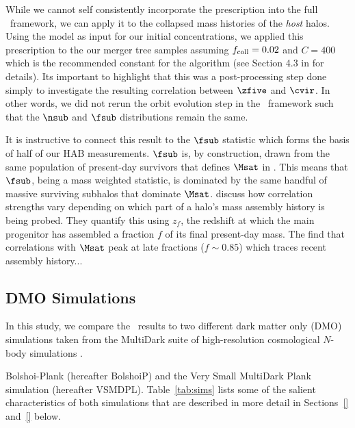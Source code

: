 While we cannot self consistently incorporate the \cite{Ludlow.etal.16} prescription into the full \SatGen\ framework, we can apply it to the collapsed mass histories of the \textit{host} halos. Using the \cite{Zhao.etal.09} model as input for our initial concentrations, we applied this prescription to the our merger tree samples assuming $f_{\rm coll}=0.02$ and $C=400$ which is the recommended constant for the \cite{Parkinson.etal.08} algorithm (see Section 4.3 in \citealt{Ludlow.etal.16} for details). Its important to highlight that this was a post-processing step done simply to investigate the resulting correlation between $\zfive$ and $\cvir$. In other words, we did not rerun the orbit evolution step in the \SatGen\ framework such that the $\nsub$ and $\fsub$ distributions remain the same. 



It is instructive to connect this result to the $\fsub$ statistic which forms the basis of half of our HAB measurements. $\fsub$ is, by construction, drawn from the same population of present-day survivors that defines $\Msat$ in \cite{Monzon.etal.26}. This means that $\fsub$, being a mass weighted statistic, is dominated by the same handful of massive surviving subhalos that dominate $\Msat$. \cite{Monzon.etal.26} discuss how correlation strengths vary depending on which part of a halo's mass assembly history is being probed. They quantify this using $z_f$, the redshift at which the main progenitor has assembled a fraction $f$ of its final present-day mass. The find that correlations with $\Msat$ peak at late fractions ($f\sim0.85$) which traces recent assembly history... 






\subsection{DMO Simulations}
\label{sec:sims}

In this study, we compare the \SatGen\ results to two different dark matter only (DMO) simulations taken from the MultiDark suite of high-resolution cosmological $N$-body simulations \citep{Klypin.etal.11, Riebe.etal.13, Klypin.etal.16, RodriguezPuebla.etal.16}. 

Bolshoi-Plank (hereafter BolshoiP) and the Very Small MultiDark Plank simulation (hereafter VSMDPL). Table~\ref{tab:sims} lists some of the salient characteristics of both simulations that are described in more detail in Sections~\ref{} and~\ref{} below.

